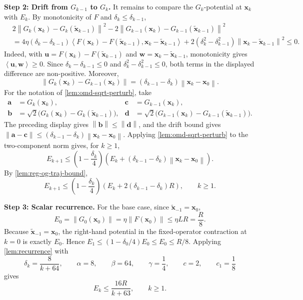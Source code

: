 \documentclass[letterpaper,11pt]{article}
\newcommand{\norm}[1]{\left\| #1 \right\|}
\newcommand{\angles}[1]{\left\langle #1 \right \rangle}
\newcommand{\vect}[1]{\mathbf{#1}}
\begin{document}
\smallskip
\noindent\textbf{Step 2: Drift from \(G_{k-1}\) to \(G_k\).}
It remains to compare the \(G_k\)-potential at \(\vect{x}_k\) with \(E_k\). By monotonicity of \(F\) and \(\delta_k\le\delta_{k-1}\),
\begin{align*}
&2\norm{G_k(\vect{x}_k)-G_k(\tilde{\vect{x}}_{k-1})}^2
-2\norm{G_{k-1}(\vect{x}_k)-G_{k-1}(\tilde{\vect{x}}_{k-1})}^2 \\
&=
4\eta(\delta_k-\delta_{k-1})
\angles{F(\vect{x}_k)-F(\tilde{\vect{x}}_{k-1}),\vect{x}_k-\tilde{\vect{x}}_{k-1}}
{}+
2(\delta_k^2-\delta_{k-1}^2)
\norm{\vect{x}_k-\tilde{\vect{x}}_{k-1}}^2
\le0.
\end{align*}
Indeed, with \(\vect{u}=F(\vect{x}_k)-F(\tilde{\vect{x}}_{k-1})\) and \(\vect{w}=\vect{x}_k-\tilde{\vect{x}}_{k-1}\), monotonicity gives \(\angles{\vect{u},\vect{w}}\ge0\). Since \(\delta_k-\delta_{k-1}\le0\) and \(\delta_k^2-\delta_{k-1}^2\le0\), both terms in the displayed difference are non-positive.
Moreover,
\[
    \norm{G_k(\vect{x}_k)-G_{k-1}(\vect{x}_k)}
    =
    (\delta_{k-1}-\delta_k)\norm{\vect{x}_k-\vect{x}_0}.
\]
For the notation of \cref{lem:omd-sqrt-perturb}, take
\[
\begin{aligned}
\vect{a}&=G_k(\vect{x}_k),&
\vect{c}&=G_{k-1}(\vect{x}_k),\\
\vect{b}&=\sqrt{2}\big(G_k(\vect{x}_k)-G_k(\tilde{\vect{x}}_{k-1})\big),&
\vect{d}&=\sqrt{2}\big(G_{k-1}(\vect{x}_k)-G_{k-1}(\tilde{\vect{x}}_{k-1})\big).
\end{aligned}
\]
The preceding display gives \(\norm{\vect{b}}\le\norm{\vect{d}}\), and the drift bound gives \(\norm{\vect{a}-\vect{c}}\le(\delta_{k-1}-\delta_k)\norm{\vect{x}_k-\vect{x}_0}\). Applying \cref{lem:omd-sqrt-perturb} to the two-component norm gives, for \(k\ge1\),
\[
    E_{k+1}
    \le
    \left(1-\frac{\delta_k}{4}\right)
    \left(
        E_k+(\delta_{k-1}-\delta_k)\norm{\vect{x}_k-\vect{x}_0}
    \right).
\]
By \cref{lem:reg-og-traj-bound},
\[
    E_{k+1}
    \le
    \left(1-\frac{\delta_k}{4}\right)
    \left(E_k+2(\delta_{k-1}-\delta_k)R\right),
    \qquad k\ge1.
\]

\smallskip
\noindent\textbf{Step 3: Scalar recurrence.}
For the base case, since \(\tilde{\vect{x}}_{-1}=\vect{x}_0\),
\[
    E_0=\norm{G_0(\vect{x}_0)}
    =\eta\norm{F(\vect{x}_0)}
    \le \eta L R=\frac{R}{8}.
\]
Because \(\tilde{\vect{x}}_{-1}=\vect{x}_0\), the right-hand potential in the fixed-operator contraction at \(k=0\) is exactly \(E_0\). Hence \(E_1\le(1-\delta_0/4)E_0\le E_0\le R/8\). Applying \cref{lem:recurrence} with
\[
    \delta_k=\frac{8}{k+64},\qquad
    \alpha=8,\qquad
    \beta=64,\qquad
    \gamma=\frac14,\qquad
    c=2,\qquad
    c_1=\frac18
\]
gives
\[
    E_k\le \frac{16R}{k+63},\qquad k\ge1.
\]
\end{document}
